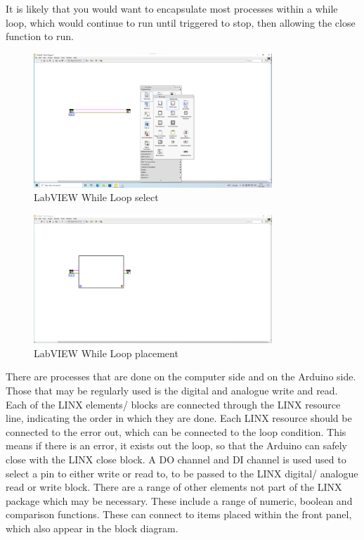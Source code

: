 \documentclass[a4paper,11pt]{report}
\begin{document}
It is likely that you would want to encapsulate most processes within a while loop, which would continue to run until triggered to stop, then allowing the close function to run.

\begin{figure}[H]
\centering
\includegraphics[width=0.8\textwidth]{screenshots/labview8}
\caption{LabVIEW While Loop select}
\end{figure}

\begin{figure}[H]
\centering
\includegraphics[width=0.8\textwidth]{screenshots/labview9}
\caption{LabVIEW While Loop placement}
\end{figure}

There are processes that are done on the computer side and on the Arduino side. Those that may be regularly used is the digital and analogue write and read. Each of the LINX elements/ blocks are connected through the LINX resource line, indicating the order in which they are done. Each LINX resource should be connected to the error out, which can be connected to the loop condition. This means if there is an error, it exists out the loop, so that the Arduino can safely close with the LINX close block. A DO channel and DI channel is used used to select a pin to either write or read to, to be passed to the LINX digital/ analogue read or write block. There are a range of other elements not part of the LINX package which may be necessary. These include a range of numeric, boolean and comparison functions. These can connect to items placed within the front panel, which also appear in the block diagram.
\end{document}
